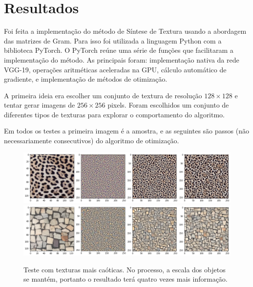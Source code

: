 \chapter{Resultados}


Foi feita a implementação do
método de Síntese de Textura
usando a abordagem das matrizes
de Gram. 
Para isso foi utilizada 
a linguagem Python com a
biblioteca PyTorch.
O PyTorch reúne uma série de
funções que facilitaram
a implementação do método.
As principais foram: implementação
nativa da rede VGG-19, operações
aritméticas aceleradas na GPU,
cálculo automático de gradiente,
e implementação de métodos de
otimização.


A primeira ideia era escolher um
conjunto de textura de resolução
$128 \times 128$ e tentar gerar
imagens de $256 \times 256$ pixels.
Foram escolhidos um conjunto de
diferentes tipos de texturas 
para explorar o comportamento
do algoritmo.


Em todos os testes a primeira imagem é
a amostra, e as seguintes são passos (não
necessariamente consecutivos) do
algoritmo de otimização.

\begin{figure}[!ht]
	\centering
	\includegraphics[width=\linewidth]{files/assets/results/result2.png}
	\includegraphics[width=\linewidth]{files/assets/results/result5.png}
	\caption{Teste com texturas mais caóticas. No processo,
	a escala dos objetos se mantém, portanto o resultado
	terá quatro vezes mais informação.}
	\label{img:preview}
\end{figure}



